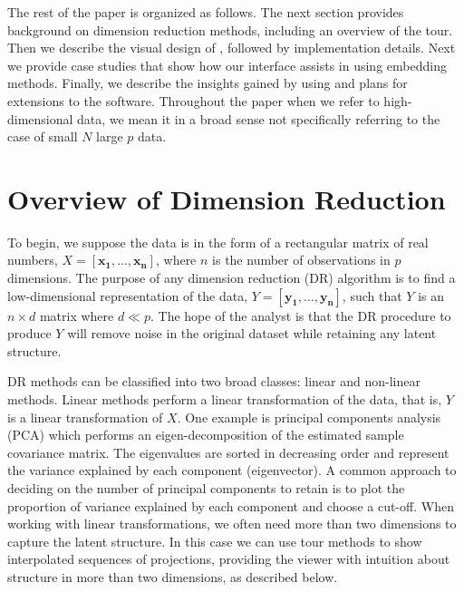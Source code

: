 \documentclass[article,notitle]{jdssv}
\begin{document}
The rest of the paper is organized as follows. The next section provides
background on dimension reduction methods, including an overview of the tour.
Then we describe the visual design of , followed by implementation
details. Next we provide case studies that show how our interface assists
in using embedding methods. Finally, we describe the insights gained by using
 and plans for extensions to the software. Throughout the paper
when we refer to high-dimensional data, we mean it in a broad sense not
specifically referring to the case of small \(N\) large \(p\) data.

\hypertarget{overview-of-dimension-reduction}{%
\section{Overview of Dimension Reduction}\label{overview-of-dimension-reduction}}

To begin, we suppose the data is in the form of a rectangular
matrix of real numbers, \(X = [\mathbf{x_1}, \dots, \mathbf{x_n}]\), where \(n\) is
the number of observations in \(p\) dimensions. The purpose of any dimension reduction (DR) algorithm
is to find a low-dimensional representation of the data,
\(Y = [\mathbf{y_1}, \dots, \mathbf{y_n}]\), such that \(Y\) is an \(n \times d\)
matrix where \(d \ll p\). The hope of the analyst is that the DR procedure to
produce \(Y\) will remove noise in the original dataset while retaining any
latent structure.

DR methods can be classified into two broad classes: linear and non-linear
methods. Linear methods perform a linear transformation of the data, that is,
\(Y\) is a linear transformation of \(X\). One example is principal components
analysis (PCA) which performs an eigen-decomposition of the estimated sample
covariance matrix. The eigenvalues are sorted in decreasing order and represent
the variance explained by each component (eigenvector).
A common approach to deciding on the number of principal components to retain is
to plot the proportion of variance explained by each component and choose a
cut-off.
When working with linear transformations, we often need more than two dimensions
to capture the latent structure. In this case we can use tour methods
\citep{Asimov1985-vp, Buja1986-zr} to show interpolated sequences of projections,
providing the viewer with intuition about structure in more than two
dimensions, as described below.
\end{document}
